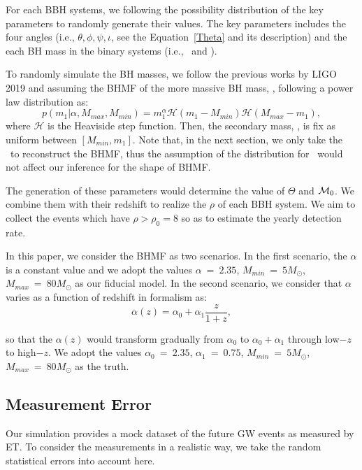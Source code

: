 \documentclass[twocolumn]{aastex62}
\begin{document}
For each BBH systems, we following the possibility distribution of the key parameters to randomly generate their values. The key parameters includes the four angles (i.e., $\theta, \phi, \psi, \iota$, see the Equation~\ref{Theta} and its description) and the each BH mass in the binary systems (i.e., \mone\ and \mtwo).

To randomly simulate the BH masses, we follow the previous works by LIGO 2019 and assuming the BHMF of the more massive BH mass, \mone, following a power law distribution as:
 \begin{equation} \label{equ_powlaw}
p(m_1|\alpha, M_{max}, M_{min}) = m_1^{\alpha} \mathcal{H}(m_1-M_{min}) \mathcal{H}(M_{max}-m_1),
 \end{equation}
where $\mathcal{H}$ is the Heaviside step function. Then, the secondary mass, \mtwo, is fix as uniform between $[M_{min}, m_1]$. Note that, in the next section, we only take the \mone\ to reconstruct the BHMF, thus the assumption of the distribution for \mtwo\ would not affect our inference for the shape of BHMF.

The generation of these parameters would determine the value of $\Theta$ and ${\cal M}_0$. We combine them with their redshift to realize the $\rho$ of each BBH system.
We aim to collect the events which have $\rho > \rho_0 = 8$ so as to estimate the yearly detection rate. 

In this paper, we consider the BHMF as two scenarios. In the first scenario, the $\alpha$ is a constant value and we adopt the values $\alpha~=~2.35$, $M_{min}~=~5M_{\odot}$, $M_{max}~=~80M_{\odot}$ as our fiducial model. In the second scenario, we consider that $\alpha$ varies as a function of redshift in formalism as:
 \begin{equation} \label{equ_alphaz}
\alpha(z) = \alpha_0 + \alpha_1\frac{z}{1+z} , 
 \end{equation}

so that the $\alpha(z)$ would transform gradually from $\alpha_0$ to $\alpha_0+\alpha_1$ through low$-z$ to high$-z$. We adopt the values $\alpha_0~=~2.35$, $\alpha_1~=~0.75$, $M_{min}~=~5M_{\odot}$, $M_{max}~=~80M_{\odot}$ as the truth.

\subsection{Measurement Error} \label{sec_noiselevel}
Our simulation provides a mock dataset of the future GW events as measured by ET. To consider the measurements in a realistic way, we take the random statistical errors into account here.
\end{document}
